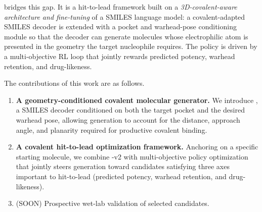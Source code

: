 \covagen{} bridges this gap. It is a hit-to-lead framework built on a \emph{3D-covalent-aware architecture and fine-tuning} of a SMILES language model: a covalent-adapted SMILES decoder is extended with a pocket and warhead-pose conditioning module so that the decoder can generate molecules whose electrophilic atom is presented in the geometry the target nucleophile requires. The policy is driven by a multi-objective RL loop that jointly rewards predicted potency, warhead retention, and drug-likeness.

The contributions of this work are as follows.
\begin{enumerate}
  \item \textbf{A geometry-conditioned covalent molecular generator.} We introduce \Cvcond{}, a SMILES decoder conditioned on both the target pocket and the desired warhead pose, allowing generation to account for the distance, approach angle, and planarity required for productive covalent binding.
  \item \textbf{A covalent hit-to-lead optimization framework.} Anchoring on a specific starting molecule, we combine \covagen{}-v2 with multi-objective policy optimization that jointly steers generation toward candidates satisfying three axes important to hit-to-lead (predicted potency, warhead retention, and drug-likeness).
  \item (SOON) Prospective wet-lab validation of selected candidates.
\end{enumerate}

